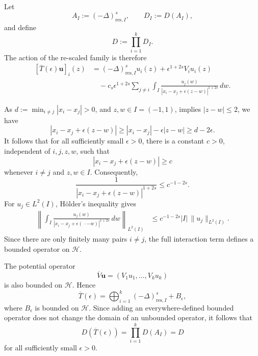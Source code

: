 \documentclass[preprint,12pt]{elsarticle}
\newcommand{\fvect}[1]{\mathbf{#1}}
\newtheorem{corollary}[theorem]{Corollary}
\begin{document}
Let
\[
    A_I:=(-\Delta)^s_{\mathrm{res},I},
    \qquad
    D_I:=D(A_I),
\]
and define
\[
    D:=\prod_{i=1}^kD_I.
\]
The action of the re-scaled family is therefore
\begin{align}\label{rescaled_family_pert_op}
    [\overline T(\epsilon)\fvect{u}]_i(z)
    &=
    (-\Delta)^s_{\mathrm{res},I}u_i(z)
    +
    \epsilon^{1+2s}V_i u_i(z)\nonumber\\
    &\quad-
    c_s\epsilon^{1+2s}
    \sum_{j\neq i}
    \int_I
    \frac{u_j(w)}
    {|x_i-x_j+\epsilon(z-w)|^{1+2s}}\,dw.
\end{align}

As $d:=\min_{i\neq j}|x_i-x_j|>0$, and $z,w\in I=(-1,1)$, implies $|z-w|\leq 2$, we have
\[
    |x_i-x_j+\epsilon(z-w)|
    \geq |x_i-x_j|-\epsilon|z-w|
    \geq d-2\epsilon.
\]
It follows that for all sufficiently small $\epsilon>0$, there is a constant
$c>0$, independent of $i,j,z,w$, such that
\[
    |x_i-x_j+\epsilon(z-w)|\geq c
\]
whenever $i\neq j$ and $z,w\in I$. Consequently,
\[
    \frac{1}
    {|x_i-x_j+\epsilon(z-w)|^{1+2s}}
    \leq c^{-1-2s}.
\]
For $u_j\in L^2(I)$, Hölder's inequality gives
\begin{align*}
    \left\|
    \int_I
    \frac{u_j(w)}
    {|x_i-x_j+\epsilon(\,\cdot-w)|^{1+2s}}\,dw
    \right\|_{L^2(I)}
    &\leq
    c^{-1-2s}|I|\,
    \|u_j\|_{L^2(I)}.
\end{align*}
Since there are only finitely many pairs $i\neq j$, the full
interaction term defines a bounded operator on $\mathcal H$.

The potential operator
\[
    \overline V\fvect{u}
    =
    (V_1u_1,\ldots,V_ku_k)
\]
is also bounded on $\mathcal H$. Hence
\[
    \overline T(\epsilon)
    =
    \bigoplus_{i=1}^k(-\Delta)^s_{\mathrm{res},I}+B_\epsilon,
\]
where $B_\epsilon$ is bounded on $\mathcal H$. Since adding an
everywhere-defined bounded operator does not change the domain of an
unbounded operator, it follows that
\[
    D(\overline T(\epsilon))
    =
    \prod_{i=1}^kD(A_I)
    =
    D
\]
for all sufficiently small $\epsilon>0$.\\


\end{document}
